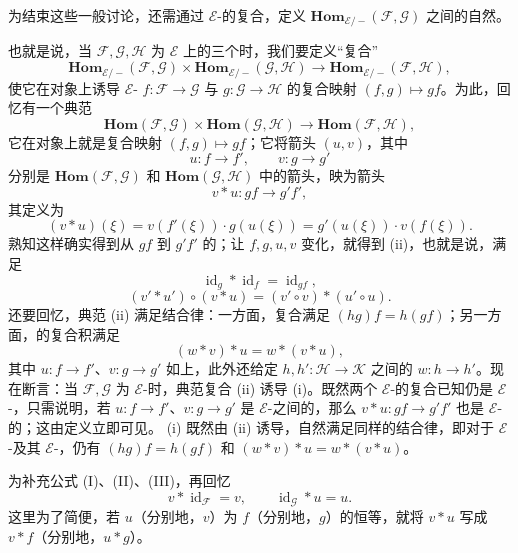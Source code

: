 为结束这些一般讨论，还需通过 $\mathcal E$-的复合，定义 $\mathbf{Hom}_{\mathcal E/-}(\mathcal F,\mathcal G)$ 之间的自然。

也就是说，当 $\mathcal F,\mathcal G,\mathcal H$ 为 $\mathcal E$ 上的三个时，我们要定义“复合”
\[
 \mathbf{Hom}_{\mathcal E/-}(\mathcal F,\mathcal G)\times
 \mathbf{Hom}_{\mathcal E/-}(\mathcal G,\mathcal H)
 \longrightarrow\mathbf{Hom}_{\mathcal E/-}(\mathcal F,\mathcal H),\tag{i}
\]
使它在对象上诱导 $\mathcal E$- $f:\mathcal F\to\mathcal G$ 与 $g:\mathcal G\to\mathcal H$ 的复合映射 $(f,g)\mapsto gf$。为此，回忆有一个典范
\[
 \mathbf{Hom}(\mathcal F,\mathcal G)\times\mathbf{Hom}(\mathcal G,\mathcal H)
 \longrightarrow\mathbf{Hom}(\mathcal F,\mathcal H),\tag{ii}
\]
它在对象上就是复合映射 $(f,g)\mapsto gf$；它将箭头 $(u,v)$，其中
\[
 u:f\longrightarrow f',\qquad v:g\longrightarrow g'
\]
分别是 $\mathbf{Hom}(\mathcal F,\mathcal G)$ 和 $\mathbf{Hom}(\mathcal G,\mathcal H)$ 中的箭头，映为箭头
\[
 v*u:gf\longrightarrow g'f',
\]
其定义为
\[
 (v*u)(\xi)=v(f'(\xi))\cdot g(u(\xi))
 =g'(u(\xi))\cdot v(f(\xi)).
\]
熟知这样确实得到从 $gf$ 到 $g'f'$ 的；让 $f,g,u,v$ 变化，就得到 (ii)，也就是说，满足
\[
 \operatorname{id}_g*\operatorname{id}_f=\operatorname{id}_{gf},\tag{I}
\]
\[
 (v'*u')\circ(v*u)=(v'\circ v)*(u'\circ u).\tag{II}
\]
还要回忆，典范 (ii) 满足结合律：一方面，复合满足 $(hg)f=h(gf)$；另一方面，的复合积满足
\[
 (w*v)*u=w*(v*u),\tag{III}
\]
其中 $u:f\to f'$、$v:g\to g'$ 如上，此外还给定 $h,h':\mathcal H\to\mathcal K$ 之间的 $w:h\to h'$。现在断言：当 $\mathcal F,\mathcal G$ 为 $\mathcal E$-时，典范复合 (ii) 诱导 (i)。既然两个 $\mathcal E$-的复合已知仍是 $\mathcal E$-，只需说明，若 $u:f\to f'$、$v:g\to g'$ 是 $\mathcal E$-之间的，那么 $v*u:gf\to g'f'$ 也是 $\mathcal E$-的；这由定义立即可见。 (i) 既然由 (ii) 诱导，自然满足同样的结合律，即对于 $\mathcal E$-及其 $\mathcal E$-，仍有 $(hg)f=h(gf)$ 和 $(w*v)*u=w*(v*u)$。

为补充公式 (I)、(II)、(III)，再回忆
\[
 v*\operatorname{id}_{\mathcal F}=v,\qquad
 \operatorname{id}_{\mathcal G}*u=u.\tag{IV}
\]
这里为了简便，若 $u$（分别地，$v$）为 $f$（分别地，$g$）的恒等，就将 $v*u$ 写成 $v*f$（分别地，$u*g$）。

